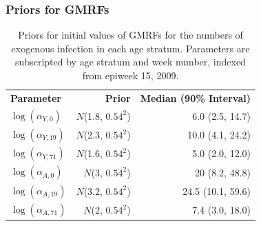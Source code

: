 \newpage
\subsubsection{Priors for GMRFs}
\label{subsubsec:flu_gmrf_priors}

\begin{table}[htbp]
	\caption[Priors for initial values of GMRFs for the numbers of exogenous infection in each age stratum.]{Priors for initial values of GMRFs for the numbers of exogenous infection in each age stratum. Parameters are subscripted by age stratum and week number, indexed from epiweek 15, 2009.}
	\label{tab:flu_alpha_gmrf_initpriors}
	\centering
	\begin{tabular}{lrr}
		\hline
		\textbf{Parameter} & \textbf{Prior} & \textbf{Median (90\% Interval)} \\ 
		$ \log(\alpha_{Y,0}) $ & $ N $(1.8, $ 0.54^2 $) & 6.0 (2.5, 14.7) \\ 
		$ \log(\alpha_{Y,19}) $ & $ N $(2.3, $ 0.54^2 $) & 10.0 (4.1, 24.2) \\
		$ \log(\alpha_{Y,71}) $ & $ N $(1.6, $ 0.54^2 $) & 5.0 (2.0, 12.0) \\
		$ \log(\alpha_{A,0}) $ & $ N $(3, $ 0.54^2 $) & 20 (8.2, 48.8) \\ 
		$ \log(\alpha_{A,19}) $ & $ N $(3.2, $ 0.54^2 $) & 24.5 (10.1, 59.6) \\
		$ \log(\alpha_{A,71}) $ & $ N $(2, $ 0.54^2 $) & 7.4 (3.0, 18.0) \\
		\hline
	\end{tabular}
\end{table}

